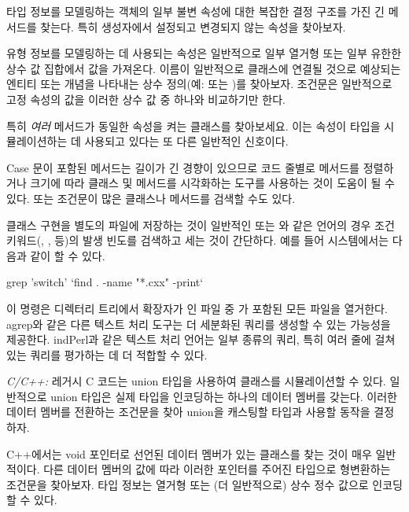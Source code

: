\documentclass[a4paper,10pt,twoside]{book}
\begin{document}
\begin{bulletlist}
\item 타입 정보를 모델링하는 객체의 일부 불변 속성에 대한 복잡한 결정 구조를 가진 긴 메서드를 찾는다. 특히 생성자에서 설정되고 변경되지 않는 속성을 찾아보자.

\item 유형 정보를 모델링하는 데 사용되는 속성은 일반적으로 일부 열거형 또는 일부 유한한 상수 값 집합에서 값을 가져온다. 이름이 일반적으로 클래스에 연결될 것으로 예상되는 엔티티 또는 개념을 나타내는 상수 정의(예:  또는 )를 찾아보자. 조건문은 일반적으로 고정 속성의 값을 이러한 상수 값 중 하나와 비교하기만 한다.

\item 특히 \emph{여러} 메서드가 동일한 속성을 켜는 클래스를 찾아보세요. 이는 속성이 타입을 시뮬레이션하는 데 사용되고 있다는 또 다른 일반적인 신호이다.

\item Case 문이 포함된 메서드는 길이가 긴 경향이 있으므로 코드 줄별로 메서드를 정렬하거나 크기에 따라 클래스 및 메서드를 시각화하는 도구를 사용하는 것이 도움이 될 수 있다. 또는 조건문이 많은 클래스나 메서드를 검색할 수도 있다.

\item 클래스 구현을 별도의 파일에 저장하는 것이 일반적인  또는 와 같은 언어의 경우 조건 키워드(, ,  등)의 발생 빈도를 검색하고 세는 것이 간단하다. 예를 들어  시스템에서는 다음과 같이 할 수 있다.

\begin{code}
grep 'switch' `find . -name "*.cxx" -print`
\end{code}

이 명령은 디렉터리 트리에서 확장자가 인 파일 중 가 포함된 모든 파일을 열거한다. agrep와 같은 다른 텍스트 처리 도구는 더 세분화된 쿼리를 생성할 수 있는 가능성을 제공한다. ind{Perl}과 같은 텍스트 처리 언어는 일부 종류의 쿼리, 특히 여러 줄에 걸쳐 있는 쿼리를 평가하는 데 더 적합할 수 있다.

\item \emph{C/C++:}
레거시 C 코드는 union 타입을 사용하여 클래스를 시뮬레이션할 수 있다. 일반적으로 union 타입은 실제 타입을 인코딩하는 하나의 데이터 멤버를 갖는다. 이러한 데이터 멤버를 전환하는 조건문을 찾아 union을 캐스팅할 타입과 사용할 동작을 결정하자.

C++에서는 void 포인터로 선언된 데이터 멤버가 있는 클래스를 찾는 것이 매우 일반적이다. 다른 데이터 멤버의 값에 따라 이러한 포인터를 주어진 타입으로 형변환하는 조건문을 찾아보자. 타입 정보는 열거형 또는 (더 일반적으로) 상수 정수 값으로 인코딩할 수 있다.


\end{bulletlist}
\end{document}
